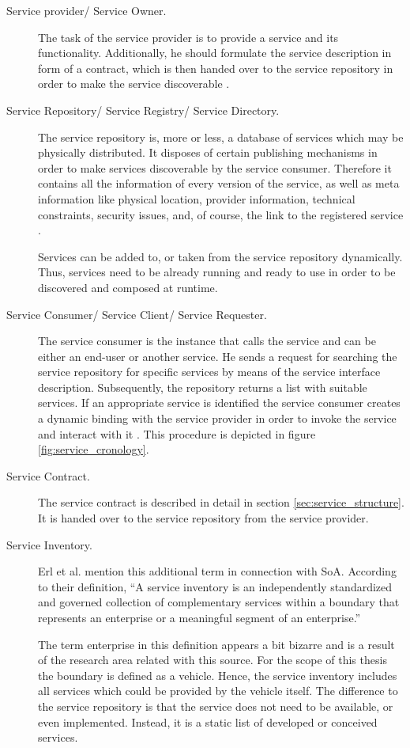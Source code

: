 \begin{description}
\item [Service provider/ Service Owner.] 
The task of the service provider is to provide a service and its functionality. Additionally, he should formulate the service description in form of a contract, which is then handed over to the service repository in order to make the service discoverable \cite{breivold}.

\item [Service Repository/ Service Registry/ Service Directory.]
The service repository is, more or less, a database of services which may be physically distributed. It disposes of certain publishing mechanisms in order to make services discoverable by the service consumer. Therefore it contains all the information of every version of the service, as well as meta information like physical location, provider information, technical constraints, security issues, and, of course, the link to the registered service \cite[p.60-61]{krafzig} \cite{breivold} \cite{converge}.

Services can be added to, or taken from the service repository dynamically. Thus, services need to be already running and ready to use in order to be discovered and composed at runtime.

\item [Service Consumer/ Service Client/ Service Requester.]
The service consumer is the instance that calls the service and can be either an end-user or another service. He sends a request for searching the service repository for specific services by means of the service interface description. Subsequently, the repository returns a list with suitable services. If an appropriate service is identified the service consumer creates a dynamic binding with the service provider in order to invoke the service and interact with it \cite{breivold}. This procedure is depicted in figure \ref{fig:service_cronology}.

\item [Service Contract.]
The service contract is described in detail in section \ref{sec:service_structure}. It is handed over to the service repository from the service provider.

\item [Service Inventory.]
Erl et al. \cite[p.41]{erl2011} mention this additional term in connection with SoA. According to their definition, ``A service inventory is an independently standardized and governed collection of complementary services within a boundary that represents an enterprise or a meaningful segment of an enterprise.'' 

The term enterprise in this definition appears a bit bizarre and is a result of the research area related with this source. For the scope of this thesis the boundary is defined as a vehicle. Hence, the service inventory includes all services which could be provided by the vehicle itself. The difference to the service repository is that the service does not need to be available, or even implemented. Instead, it is a static list of developed or conceived services.
\end{description}


